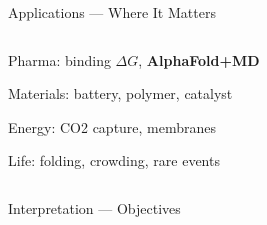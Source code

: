 \begin{frame}{Applications --- Where It Matters}
	\begin{columns}[T,onlytextwidth]
		\begin{pitemize}
			\item Pharma: binding $\Delta G$, \textbf{AlphaFold+MD}
			\item Materials: battery, polymer, catalyst
			\item Energy: CO2 capture, membranes
			\item Life: folding, crowding, rare events
		\end{pitemize}
	\end{columns}
\end{frame}

\begin{frame}{Interpretation --- Objectives}
\end{frame}
